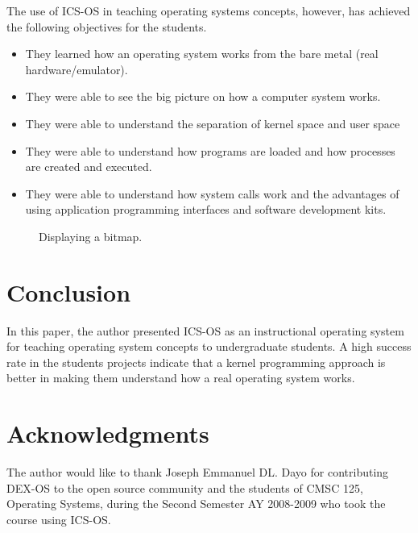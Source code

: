 \documentclass{acm_proc_article-sp}
\begin{document}
The use of ICS-OS in teaching operating systems concepts, however, has 
achieved the following objectives for the students.
\begin{itemize}
\item{They learned how an operating system works from the bare metal 
(real hardware/emulator).}
\item{They were able to see the big picture on how a computer system works.}
\item{They were able to understand the separation of kernel space and 
user space}
\item{They were able to understand how programs are loaded and how processes 
are created and executed.}
\item{They were able to understand how system calls work and the advantages
of using application programming interfaces and software development kits.}
\end{itemize}

\begin{figure}
\centering
{}
\caption{Displaying a bitmap.}
\end{figure}


\section{Conclusion}
In this paper, the author presented ICS-OS as an instructional operating 
system for teaching operating system concepts to undergraduate students. 
A high success rate in the students projects indicate that a kernel programming
approach is better in making them understand how a real operating system works.


\section{Acknowledgments}
The author would like to thank Joseph Emmanuel DL. Dayo for contributing 
DEX-OS to the open source community and the students of CMSC 125, Operating
Systems, during the Second Semester AY 2008-2009 who took the course 
using ICS-OS.




\balancecolumns
\end{document}
